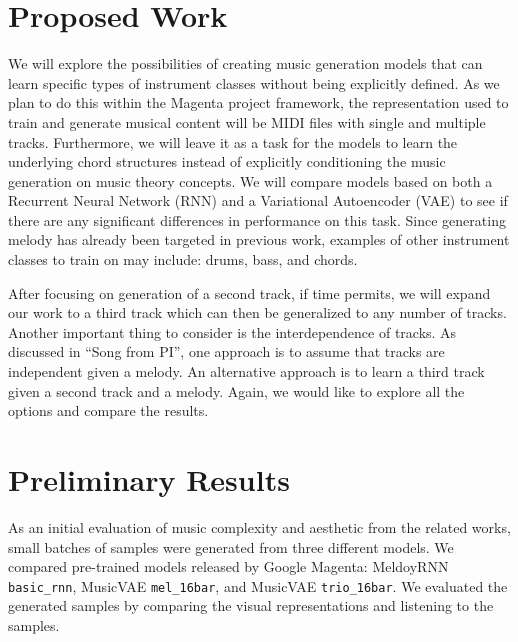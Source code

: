 \documentclass{article}
\begin{document}
\section{Proposed Work}
We will explore the possibilities of creating music generation models that can learn specific types of instrument classes without being explicitly defined. As we plan to do this within the Magenta project framework, the representation used to train and generate musical content will be MIDI files with single and multiple tracks. Furthermore, we will leave it as a task for the models to learn the underlying chord structures instead of explicitly conditioning the music generation on music theory concepts. We will compare models based on both a Recurrent Neural Network (RNN) and a Variational Autoencoder (VAE) to see if there are any significant differences in performance on this task. Since generating melody has already been targeted in previous work, examples of other instrument classes to train on may include: drums, bass, and chords.

After focusing on generation of a second track, if time permits, we will expand our work to a third track which can then be generalized to any number of tracks. Another important thing to consider is the interdependence of tracks. As discussed in ``Song from PI'', one approach is to assume that tracks are independent given a melody. An alternative approach is to learn a third track given a second track and a melody. Again, we would like to explore all the options and compare the results.


\section{Preliminary Results}

As an initial evaluation of music complexity and aesthetic from the related works, small batches of samples were generated from three different models. We compared pre-trained models released by Google Magenta: MeldoyRNN \verb|basic_rnn|, MusicVAE \verb|mel_16bar|, and MusicVAE \verb|trio_16bar|. We evaluated the generated samples by comparing the visual representations and listening to the samples.
\end{document}
